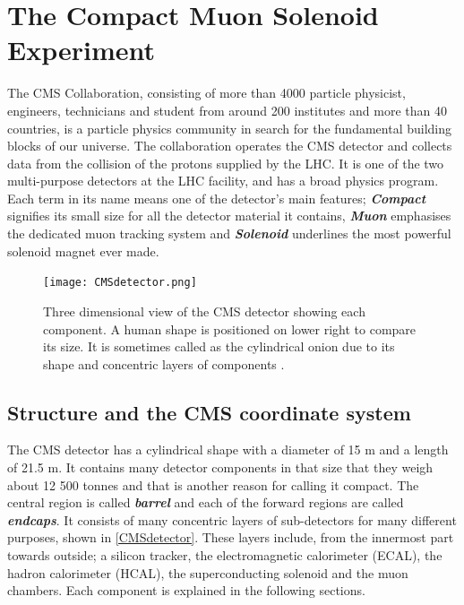 \section{The Compact Muon Solenoid Experiment}\label{cms}

The CMS Collaboration, consisting of more than 4000 particle physicist, engineers, technicians and student from around 200 institutes and more than 40 countries, is a  particle physics community in search for the fundamental building blocks of our universe. The collaboration operates the CMS detector and collects data from the collision of the protons supplied by the LHC. It is one of the two multi-purpose detectors at the LHC facility, and has a broad physics program. Each term in its name means one of the detector's main features; \textbf{\emph{Compact}} signifies its small size for all the detector material it contains, \textbf{\emph{Muon}} emphasises the dedicated muon tracking system and \textbf{\emph{Solenoid}} underlines the most powerful solenoid magnet ever made.

\begin{figure}[ht]
	\centering
	\texttt{[image: CMSdetector.png]}
	\vspace{2mm}
	\caption[Three dimensional view of the CMS detector showing each component. A human shape is positioned on lower right to compare its size. It is sometimes called as the cylindrical onion due to its shape and concentric layers of components.]
	{Three dimensional view of the CMS detector showing each component. A human shape is positioned on lower right to compare its size. It is sometimes called as the cylindrical onion due to its shape and concentric layers of components \cite{CMSdetector}.}
	\label{CMSdetector}
\end{figure}

\subsection{Structure and the CMS coordinate system}

The CMS detector has a cylindrical shape with a diameter of 15 m and a length of 21.5 m. It contains many detector components in that size that they weigh about 12 500 tonnes and that is another reason for calling it compact. The central region is called \textbf{\emph{barrel}} and each of the forward regions are called \textbf{\emph{endcaps}}. It consists of many concentric layers of sub-detectors for many different purposes, shown in \autoref{CMSdetector}. These layers include, from the innermost part towards outside; a silicon tracker, the electromagnetic calorimeter (ECAL), the hadron calorimeter (HCAL), the superconducting solenoid and the muon chambers. Each component is explained in the following sections. 


